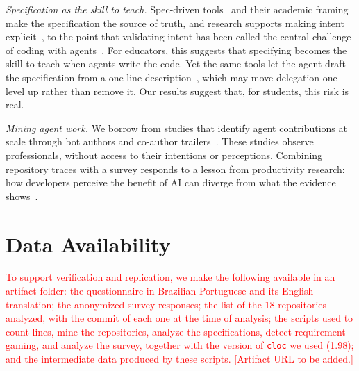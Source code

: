 \documentclass[conference]{IEEEtran}
\begin{document}
\emph{Specification as the skill to teach.} Spec-driven tools~\cite{delimarsky2025speckit,kiro2026specs} and their academic framing~\cite{piskala2026sdd} make the specification the source of truth, and research supports making intent explicit~\cite{fakhoury2024ticoder}, to the point that validating intent has been called the central challenge of coding with agents~\cite{lahiri2026intent}. For educators, this suggests that specifying becomes the skill to teach when agents write the code. Yet the same tools let the agent draft the specification from a one-line description~\cite{delimarsky2025speckit}, which may move delegation one level up rather than remove it. Our results suggest that, for students, this risk is real.

\emph{Mining agent work.} We borrow from studies that identify agent contributions at scale through bot authors and co-author trailers~\cite{li2026aidev,zi2025agentpack}. These studies observe professionals, without access to their intentions or perceptions. Combining repository traces with a survey responds to a lesson from productivity research: how developers perceive the benefit of AI can diverge from what the evidence shows~\cite{becker2025measuring}.

\section*{Data Availability}
\label{sec:data}

\textcolor{red}{To support verification and replication, we make the following available in an artifact folder: the questionnaire in Brazilian Portuguese and its English translation; the anonymized survey responses; the list of the 18 repositories analyzed, with the commit of each one at the time of analysis; the scripts used to count lines, mine the repositories, analyze the specifications, detect requirement gaming, and analyze the survey, together with the version of \texttt{cloc} we used (1.98); and the intermediate data produced by these scripts. [Artifact URL to be added.]}
\end{document}
